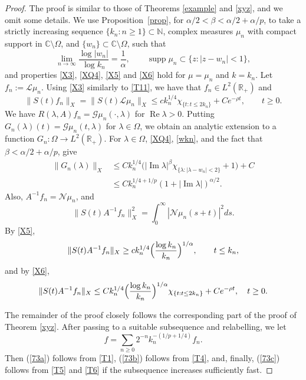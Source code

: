 \documentclass[11pt]{amsart}
\theoremstyle{definition}
\theoremstyle{remark}
\numberwithin{equation}{section}
\begin{document}
\begin{proof} The proof is similar to those of Theorems \ref{example} and \ref{xyz}, and we omit some details.  We use Proposition~\ref{prop}, for $\alpha/2<\beta<\alpha/2+\alpha/p$, to take a strictly increasing sequence $\{k_n: n\ge1 \}\subset \mathbb N$, complex measures $\mu_n$ with compact support in ${{\mathbb C}} \setminus \Omega$, and  $\{w_n\}\subset  \mathbb C\setminus \Omega$, such that
\begin{equation} \label{wkn}
\lim_{n\to\infty} \frac{\log|w_n|}{\log k_n}=\frac 1\alpha, \qquad {\operatorname{supp}}\mu_n\subset \{z:|z-w_n|<1\},
\end{equation}
 and properties \eqref{X3}, \eqref{XQ4},  \eqref{X5} and \eqref{X6} hold for $\mu=\mu_n$ and $k=k_n$.  Let $f_n:=  {{\mathcal L}}\mu_n$.  Using \eqref{X3} similarly to \eqref{T11}, we have that $f_n \in L^2(\mathbb R_+)$ and
\begin{equation} \label{T1}
 \|S(t)f_n\|_X=\|S(t)\mathcal L\mu_n\|_X\le c k_n^{1/4}\chi_{\{t:t\le 2k_n\}}+ C e^{-\rho t}, \qquad t\ge 0.
\end{equation}
We have $R(\lambda,A)f_n=\mathcal G\mu_n(\cdot,\lambda)$ for ${\operatorname{Re}}\lambda>0$. Putting $G_n(\lambda)(t) =  \mathcal G\mu_n(t,\lambda)$ for $\lambda \in \Omega$, we  obtain an analytic extension to a function $G_n : \Omega \to L^2({{\mathbb R}}_+)$.   For $\lambda \in \Omega$, \eqref{XQ4}, \eqref{wkn}, and the fact that $\beta < \alpha/2+\alpha/p$, give
\begin{align} \label{T4}
\|G_n(\lambda)\|_X &\le Ck_n^{1/4}\big(|{\operatorname{Im}} \lambda|^{\beta}\chi_{\{\lambda:|\lambda-w_n|<2\}} +1 \big) + C \\
&\le C k_n^{1/4+1/p}(1+|{\operatorname{Im}} \lambda|)^{\alpha/2}. \nonumber
\end{align}
Also, $A^{-1}f_n={{\mathcal N}}\mu_n$, and
$$
\|S(t)A^{-1}f_n\|_X^2=\int_0^\infty |{{\mathcal N}}\mu_n(s+t)|^2ds.
$$
By \eqref{X5},
\begin{equation}
\|S(t)A^{-1}f_n\|_X\ge ck_n^{1/4}\Bigl(\frac{\log k_n}{k_n}\Bigr)^{1/\alpha},\qquad t\le k_n,\label{T5}
\end{equation}
and by \eqref{X6},
\begin{equation}
\|S(t)A^{-1}f_n\|_X\le Ck_n^{1/4}\Bigl(\frac{\log k_n}{k_n}\Bigr)^{1/\alpha}\chi_{\{t:t\le 2k_n\}}+ Ce^{-\rho t},\quad t\ge 0.\label{T6}
\end{equation}

The remainder of the proof closely follows the corresponding part of the proof of Theorem \ref{xyz}.  After passing to a suitable subsequence and relabelling, we let
$$
f=\sum_{n\ge 0}2^{-n}k_{n}^{-(1/p+1/4)}f_{n}.
$$
Then (\ref{73a}) follows from \eqref{T1}, (\ref{73b}) follows from  \eqref{T4}, and, finally, (\ref{73c}) follows from \eqref{T5} and \eqref{T6} if the subsequence increases sufficiently fast.
\end{proof}
\end{document}
